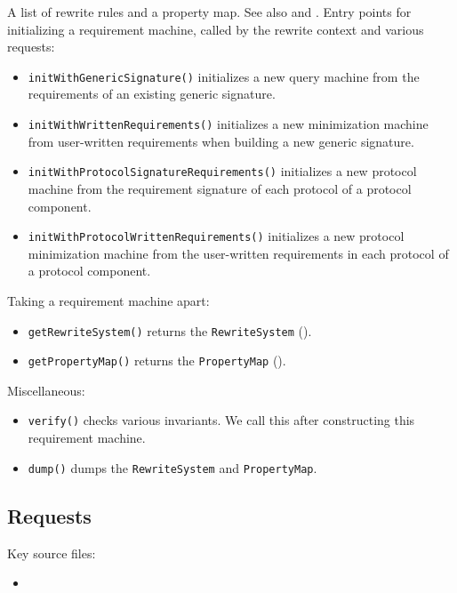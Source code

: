 \documentclass[../generics]{subfiles}
\begin{document}
A list of rewrite rules and a property map. See also  and . Entry points for initializing a requirement machine, called by the rewrite context and various requests:
\begin{itemize}
\item \texttt{initWithGenericSignature()} initializes a new query machine from the requirements of an existing generic signature.
\item \texttt{initWithWrittenRequirements()} initializes a new minimization machine from user-written requirements when building a new generic signature.
\item \texttt{initWithProtocolSignatureRequirements()} initializes a new protocol machine from the requirement signature of each protocol of a protocol component.
\item \texttt{initWithProtocolWrittenRequirements()} initializes a new protocol minimization machine from the user-written requirements in each protocol of a protocol component.
\end{itemize}
Taking a requirement machine apart:
\begin{itemize}
\item \texttt{getRewriteSystem()} returns the \texttt{RewriteSystem} ().
\item \texttt{getPropertyMap()} returns the \texttt{PropertyMap} ().
\end{itemize}
Miscellaneous:
\begin{itemize}
\item \texttt{verify()} checks various invariants. We call this after constructing this requirement machine.
\item \texttt{dump()} dumps the \texttt{RewriteSystem} and \texttt{PropertyMap}.
\end{itemize}

\subsection*{Requests}

Key source files:
\begin{itemize}
\item {}
\end{itemize}
\end{document}
